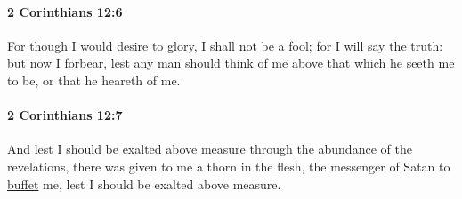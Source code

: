 		\paragraph{2 Corinthians 12:6} %
			\label{2CORINTHIANS-12-6}

			For though I would desire to glory, I shall not be a fool; for I will say the truth: but now I forbear, lest any man should think of me above that which he seeth me to be, or that he heareth of me.

			\begin{framed}
			\scriptsize
				\begin{compactdesc}
					\item[SBLG] 
				\end{compactdesc}
			\end{framed}

		\paragraph{2 Corinthians 12:7} %
			\label{2CORINTHIANS-12-7}

			And lest I should be exalted above measure through the abundance of the revelations, there was given to me a thorn in the flesh, the messenger of Satan to \hyperref[BUFFET]{buffet} me, lest I should be exalted above measure.

